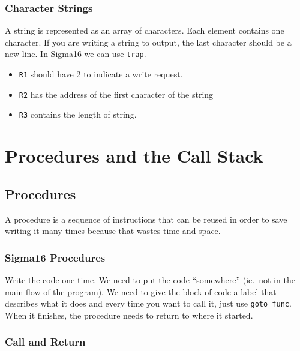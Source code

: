 \subsubsection{Character Strings}\label{ssub:character_strings}

A string is represented as an array of characters.
Each element contains one character.
If you are writing a string to output, the last character should be a new line.
In Sigma16 we can use \texttt{trap}.

\begin{itemize}
    \item \texttt{R1} should have \(2\) to indicate a write request.
    \item \texttt{R2} has the address of the first character of the string
    \item \texttt{R3} contains the length of string.
\end{itemize}

\section{Procedures and the Call Stack}\label{sec:procedures_and_the_call_stack}

\subsection{Procedures}\label{sub:procedures}

A procedure is a sequence of instructions that can be reused in order to save writing it many times because that wastes time and space.

\subsubsection{Sigma16 Procedures}\label{ssub:sigma16_procedures}

Write the code one time.
We need to put the code ``somewhere'' (ie.\ not in the main flow of the program).
We need to give the block of code a label that describes what it does and every time you want to call it, just use \texttt{goto func}.
When it finishes, the procedure needs to return to where it started.

\subsubsection{Call and Return}\label{ssub:call_and_return}

